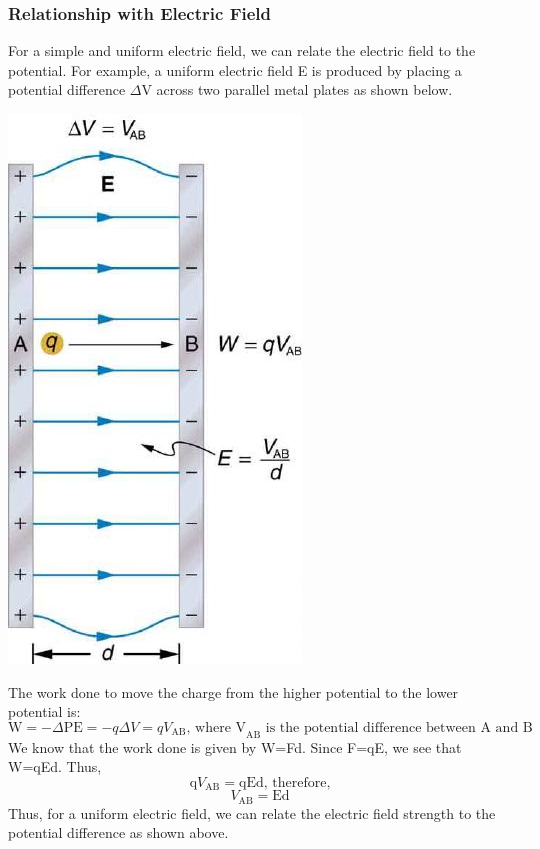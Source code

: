 \documentclass[9pt]{article}
\begin{document}
	\subsubsection*{Relationship with Electric Field}
	For a simple and uniform electric field, we can relate the electric field to the potential. For example, a uniform electric field E is produced by placing a potential difference $\Delta$V across two parallel metal plates as shown below.
	\begin{center}
		\includegraphics[scale=0.3]{metal_plates_v}
	\end{center}
	The work done to move the charge from the higher potential to the lower potential is:
	$$\text{W}=-\Delta \text{PE}=-q\Delta V=qV_{\text{AB}}\text{, where V}_{\text{AB}}\text{ is the potential difference between A and B}$$
	We know that the work done is given by W=Fd. Since F=qE, we see that W=qEd. Thus,
	$$\text{q}V_{\text{AB}}=\text{qEd}\text{, therefore,}$$
	$$V_{\text{AB}}=\text{Ed}$$
	Thus, for a uniform electric field, we can relate the electric field strength to the potential difference as shown above.
\end{document}

